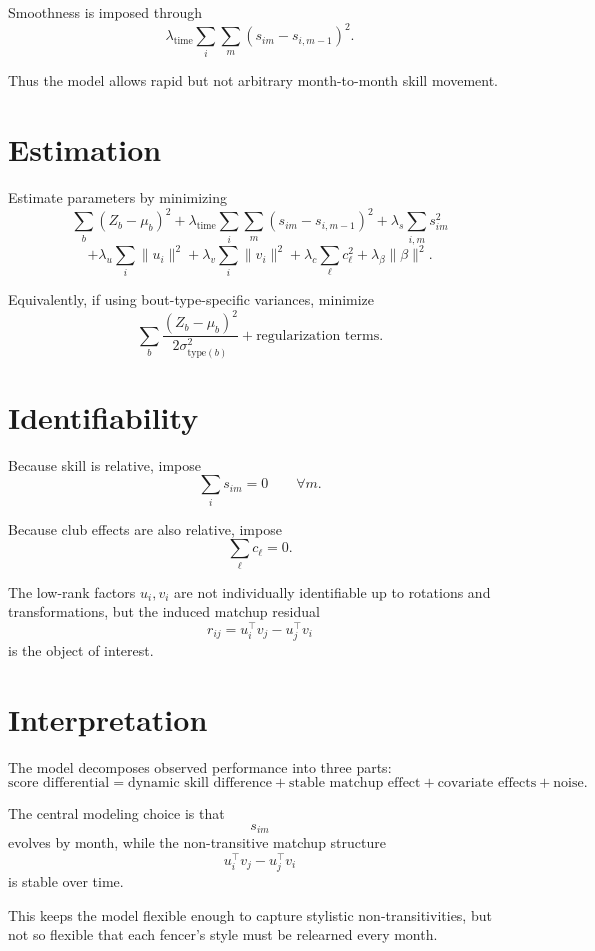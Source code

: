 \documentclass[11pt]{article}
\begin{document}
Smoothness is imposed through
\[
\lambda_{\mathrm{time}}
\sum_i\sum_m
\left(s_{im}-s_{i,m-1}\right)^2.
\]

Thus the model allows rapid but not arbitrary month-to-month skill movement.

\section{Estimation}

Estimate parameters by minimizing
\[
\sum_b
\left(Z_b-\mu_b\right)^2
+
\lambda_{\mathrm{time}}
\sum_i\sum_m
\left(s_{im}-s_{i,m-1}\right)^2
+
\lambda_s\sum_{i,m}s_{im}^2
\]
\[
+
\lambda_u\sum_i \|u_i\|^2
+
\lambda_v\sum_i \|v_i\|^2
+
\lambda_c\sum_\ell c_\ell^2
+
\lambda_\beta \|\beta\|^2.
\]

Equivalently, if using bout-type-specific variances, minimize
\[
\sum_b
\frac{
\left(Z_b-\mu_b\right)^2
}{
2\sigma_{\mathrm{type}(b)}^2
}
+
\text{regularization terms}.
\]

\section{Identifiability}

Because skill is relative, impose
\[
\sum_i s_{im}=0
\qquad \forall m.
\]

Because club effects are also relative, impose
\[
\sum_\ell c_\ell=0.
\]

The low-rank factors $u_i,v_i$ are not individually identifiable up to rotations and transformations, but the induced matchup residual
\[
r_{ij}=u_i^\top v_j-u_j^\top v_i
\]
is the object of interest.

\section{Interpretation}

The model decomposes observed performance into three parts:
\[
\text{score differential}
=
\text{dynamic skill difference}
+
\text{stable matchup effect}
+
\text{covariate effects}
+
\text{noise}.
\]

The central modeling choice is that
\[
s_{im}
\]
evolves by month, while the non-transitive matchup structure
\[
u_i^\top v_j-u_j^\top v_i
\]
is stable over time.

This keeps the model flexible enough to capture stylistic non-transitivities, but not so flexible that each fencer's style must be relearned every month.
\end{document}
